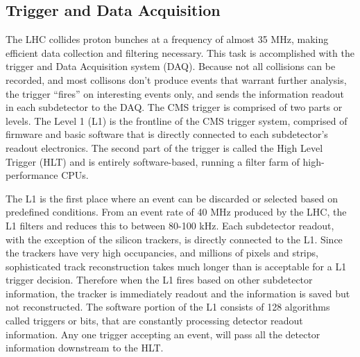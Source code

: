 \subsection{Trigger and Data Acquisition}

The LHC collides proton bunches at a frequency of almost 35 MHz, making efficient data collection and filtering necessary. This task is accomplished with the trigger and Data Acquisition system (DAQ). Because not all collisions can be recorded,
and most collisons don't produce events that warrant further analysis, the trigger ``fires'' on interesting events only, and sends the information readout in each subdetector to the DAQ. The CMS trigger is comprised of two parts or levels.
The Level 1 (L1) is the frontline of the CMS trigger system, comprised of firmware and basic software that is directly connected to each subdetector's readout electronics. The second part of the trigger is called the High Level Trigger (HLT)
and is entirely software-based, running a filter farm of high-performance CPUs. 

The L1 is the first place where an event can be discarded or selected based on predefined conditions. From an event rate of 40 MHz produced by the LHC, the L1 filters and reduces this to between 80-100 kHz.  
Each subdetector readout, with the exception of the silicon trackers, is directly connected to the L1. Since the trackers have very high occupancies, and millions
of pixels and strips, sophisticated track reconstruction takes much longer than is acceptable for a L1 trigger decision. Therefore when the L1 fires based on other subdetector information, the tracker is immediately readout and the information is saved
but not reconstructed. The software portion of the L1 consists of 128 algorithms called triggers or bits, that are constantly processing detector readout information. Any one trigger accepting an event, will pass all the detector information downstream
to the HLT. 

